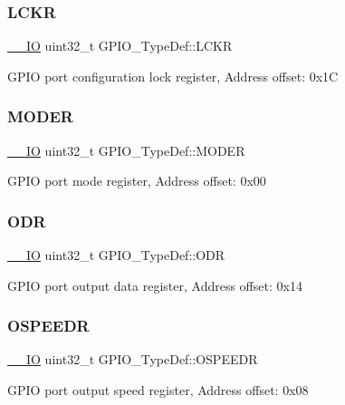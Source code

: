 \subsubsection{\texorpdfstring{LCKR}{LCKR}}
{\footnotesize\ttfamily \mbox{\hyperlink{core__sc300_8h_aec43007d9998a0a0e01faede4133d6be}{\+\_\+\+\_\+\+IO}} uint32\+\_\+t G\+P\+I\+O\+\_\+\+Type\+Def\+::\+L\+C\+KR}

G\+P\+IO port configuration lock register, Address offset\+: 0x1C \mbox{\label{struct_g_p_i_o___type_def_ac2505d096b6b650f1647b8e0ff8b196b}} 
\subsubsection{\texorpdfstring{MODER}{MODER}}
{\footnotesize\ttfamily \mbox{\hyperlink{core__sc300_8h_aec43007d9998a0a0e01faede4133d6be}{\+\_\+\+\_\+\+IO}} uint32\+\_\+t G\+P\+I\+O\+\_\+\+Type\+Def\+::\+M\+O\+D\+ER}

G\+P\+IO port mode register, Address offset\+: 0x00 \mbox{\label{struct_g_p_i_o___type_def_a6fb78f4a978a36032cdeac93ac3c9c8b}} 
\subsubsection{\texorpdfstring{ODR}{ODR}}
{\footnotesize\ttfamily \mbox{\hyperlink{core__sc300_8h_aec43007d9998a0a0e01faede4133d6be}{\+\_\+\+\_\+\+IO}} uint32\+\_\+t G\+P\+I\+O\+\_\+\+Type\+Def\+::\+O\+DR}

G\+P\+IO port output data register, Address offset\+: 0x14 \mbox{\label{struct_g_p_i_o___type_def_a0d233d720f18ae2050f9131fa6faf7c6}} 
\subsubsection{\texorpdfstring{OSPEEDR}{OSPEEDR}}
{\footnotesize\ttfamily \mbox{\hyperlink{core__sc300_8h_aec43007d9998a0a0e01faede4133d6be}{\+\_\+\+\_\+\+IO}} uint32\+\_\+t G\+P\+I\+O\+\_\+\+Type\+Def\+::\+O\+S\+P\+E\+E\+DR}

G\+P\+IO port output speed register, Address offset\+: 0x08 \mbox{\label{struct_g_p_i_o___type_def_a910885e4d881c3a459dd11640237107f}} 
